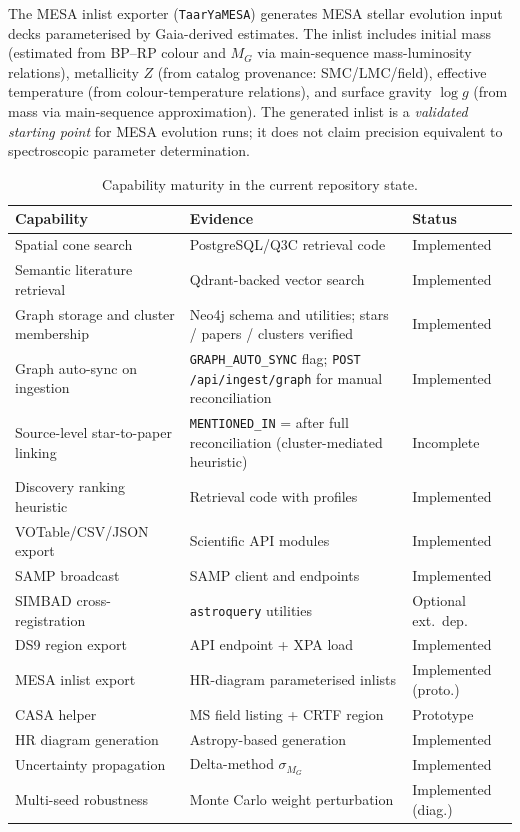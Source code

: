 \documentclass[12pt]{elsarticle}
\begin{document}
The MESA inlist exporter (\texttt{TaarYaMESA}) generates MESA stellar evolution input decks \citep{Paxton2011} parameterised by Gaia-derived estimates. The inlist includes initial mass (estimated from BP--RP colour and $M_G$ via main-sequence mass-luminosity relations), metallicity $Z$ (from catalog provenance: SMC/LMC/field), effective temperature (from colour-temperature relations), and surface gravity $\log g$ (from mass via main-sequence approximation). The generated inlist is a \emph{validated starting point} for MESA evolution runs; it does not claim precision equivalent to spectroscopic parameter determination.

\begin{table}[htbp]
\centering
\caption{Capability maturity in the current repository state.}
\label{tab:maturity}
\small
\begin{tabularx}{\textwidth}{@{}p{3.2cm}Xl@{}}
\toprule
\textbf{Capability} & \textbf{Evidence} & \textbf{Status} \\
\midrule
Spatial cone search & PostgreSQL/Q3C retrieval code & Implemented \\
Semantic literature retrieval & Qdrant-backed vector search & Implemented \\
Graph storage and cluster membership & Neo4j schema and utilities; \nStarNodes{} stars / \nPaperNodes{} papers / \nClusterNodes{} clusters verified & Implemented \\
Graph auto-sync on ingestion & \texttt{GRAPH\allowbreak\_AUTO\allowbreak\_SYNC} flag; \texttt{POST /api/\allowbreak ingest/\allowbreak graph} for manual reconciliation & Implemented \\
Source-level star-to-paper linking & \texttt{MENTIONED\allowbreak\_IN} = \nMentionedInEdges{} after full reconciliation (cluster-mediated heuristic) & Incomplete \\
Discovery ranking heuristic & Retrieval code with profiles & Implemented \\
VOTable/CSV/JSON export & Scientific API modules & Implemented \\
SAMP broadcast & SAMP client and endpoints & Implemented \\
SIMBAD cross-registration & \texttt{astroquery} utilities & Optional ext.\ dep. \\
DS9 region export & API endpoint + XPA load & Implemented \\
MESA inlist export & HR-diagram parameterised inlists & Implemented (proto.) \\
CASA helper & MS field listing + CRTF region & Prototype \\
HR diagram generation & Astropy-based generation & Implemented \\
Uncertainty propagation & Delta-method $\sigma_{M_G}$ & Implemented \\
Multi-seed robustness & Monte Carlo weight perturbation & Implemented (diag.) \\
\bottomrule
\end{tabularx}
\end{table}
\end{document}
